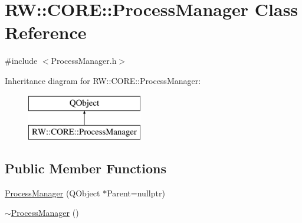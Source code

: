 \hypertarget{class_r_w_1_1_c_o_r_e_1_1_process_manager}{}\section{RW\+:\+:C\+O\+RE\+:\+:Process\+Manager Class Reference}
\label{class_r_w_1_1_c_o_r_e_1_1_process_manager}


{\ttfamily \#include $<$Process\+Manager.\+h$>$}

Inheritance diagram for RW\+:\+:C\+O\+RE\+:\+:Process\+Manager\+:\begin{figure}[H]
\begin{center}
\leavevmode
\includegraphics[height=2.000000cm]{class_r_w_1_1_c_o_r_e_1_1_process_manager}
\end{center}
\end{figure}
\subsection*{Public Member Functions}
\begin{DoxyCompactItemize}
\item 
\hyperlink{class_r_w_1_1_c_o_r_e_1_1_process_manager_adca4f2b37dd753be8064af3601855703}{Process\+Manager} (Q\+Object $\ast$Parent=nullptr)
\item 
\hyperlink{class_r_w_1_1_c_o_r_e_1_1_process_manager_abea22c7c5150ff7a2dddb353d84d0715}{$\sim$\+Process\+Manager} ()
\end{DoxyCompactItemize}
